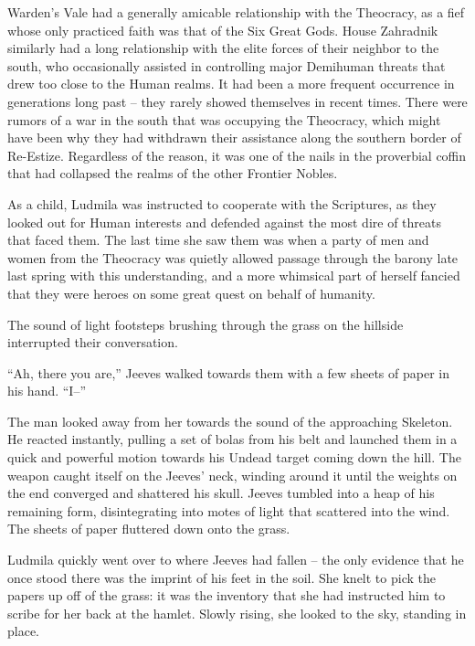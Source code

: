  

Warden’s Vale had a generally amicable relationship with the Theocracy, as a fief whose only practiced faith was that of the Six Great Gods. House Zahradnik similarly had a long relationship with the elite forces of their neighbor to the south, who occasionally assisted in controlling major Demihuman threats that drew too close to the Human realms. It had been a more frequent occurrence in generations long past – they rarely showed themselves in recent times. There were rumors of a war in the south that was occupying the Theocracy, which might have been why they had withdrawn their assistance along the southern border of Re-Estize. Regardless of the reason, it was one of the nails in the proverbial coffin that had collapsed the realms of the other Frontier Nobles.

 

As a child, Ludmila was instructed to cooperate with the Scriptures, as they looked out for Human interests and defended against the most dire of threats that faced them. The last time she saw them was when a party of men and women from the Theocracy was quietly allowed passage through the barony late last spring with this understanding, and a more whimsical part of herself fancied that they were heroes on some great quest on behalf of humanity.

 

The sound of light footsteps brushing through the grass on the hillside interrupted their conversation.

 

“Ah, there you are,” Jeeves walked towards them with a few sheets of paper in his hand. “I–”

 

The man looked away from her towards the sound of the approaching Skeleton. He reacted instantly, pulling a set of bolas from his belt and launched them in a quick and powerful motion towards his Undead target coming down the hill. The weapon caught itself on the Jeeves’ neck, winding around it until the weights on the end converged and shattered his skull. Jeeves tumbled into a heap of his remaining form, disintegrating into motes of light that scattered into the wind. The sheets of paper fluttered down onto the grass.

 

Ludmila quickly went over to where Jeeves had fallen – the only evidence that he once stood there was the imprint of his feet in the soil. She knelt to pick the papers up off of the grass: it was the inventory that she had instructed him to scribe for her back at the hamlet. Slowly rising, she looked to the sky, standing in place.

